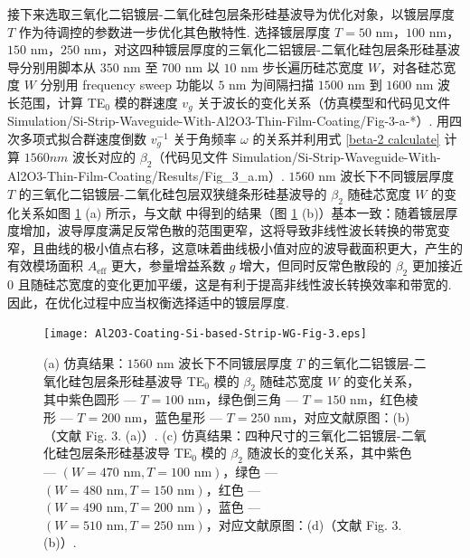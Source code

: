 \documentclass[zh]{assignment}
\begin{document}
接下来选取三氧化二铝镀层-二氧化硅包层条形硅基波导为优化对象，以镀层厚度 $T$ 作为待调控的参数进一步优化其色散特性. 选择镀层厚度 $T=50$ nm，$100$ nm，$150$ nm，$250$ nm，对这四种镀层厚度的三氧化二铝镀层-二氧化硅包层条形硅基波导分别用脚本从 $350$ nm 至 $700$ nm 以 $10$ nm 步长遍历硅芯宽度 $W$，对各硅芯宽度 $W$ 分别用 frequency sweep 功能以 $5$ nm 为间隔扫描 $1500$ nm 到 $1600$ nm 波长范围，计算 TE$_0$ 模的群速度 $v_g$ 关于波长的变化关系（仿真模型和代码见文件 Simulation/Si-Strip-Waveguide-With-Al2O3-Thin-Film-Coating/Fig-3-a-*）. 用四次多项式拟合群速度倒数 $v_g^{-1}$ 关于角频率 $\omega$ 的关系并利用式 \eqref{beta-2 calculate} 计算 $1560nm$ 波长对应的 $\beta_2$（代码见文件 Simulation/Si-Strip-Waveguide-With-Al2O3-Thin-Film-Coating/Results/Fig\_3\_a.m）. $1560$ nm 波长下不同镀层厚度 $T$ 的三氧化二铝镀层-二氧化硅包层双狭缝条形硅基波导的 $\beta_2$ 随硅芯宽度 $W$ 的变化关系如图 \ref{Al2O3-Coating-Si-based-Strip-WG-Fig-3} (a) 所示，与文献 \cite{guo2018experimentally} 中得到的结果（图 \ref{Al2O3-Coating-Si-based-Strip-WG-Fig-3} (b)）基本一致：随着镀层厚度增加，波导厚度满足反常色散的范围更窄，这将导致非线性波长转换的带宽变窄，且曲线的极小值点右移，这意味着曲线极小值对应的波导截面积更大，产生的有效模场面积 $A_{\text{eff}}$ 更大，参量增益系数 $g$ 增大，但同时反常色散段的 $\beta_2$ 更加接近 $0$ 且随硅芯宽度的变化更加平缓，这是有利于提高非线性波长转换效率和带宽的. 因此，在优化过程中应当权衡选择适中的镀层厚度.

\begin{figure}[ht]
    \centering
    \texttt{[image: Al2O3-Coating-Si-based-Strip-WG-Fig-3.eps]}
    \caption{(a) 仿真结果：$1560$ nm 波长下不同镀层厚度 $T$ 的三氧化二铝镀层-二氧化硅包层条形硅基波导 TE$_0$ 模的 $\beta_2$ 随硅芯宽度 $W$ 的变化关系，其中紫色圆形 --- $T=100$ nm，绿色倒三角 --- $T=150$ nm，红色棱形 --- $T=200$ nm，蓝色星形 --- $T=250$ nm，对应文献原图：(b)（文献 \cite{guo2018experimentally} Fig. 3. (a)）. (c) 仿真结果：四种尺寸的三氧化二铝镀层-二氧化硅包层条形硅基波导 TE$_0$ 模的 $\beta_2$ 随波长的变化关系，其中紫色 --- $(W=470\text{ nm},T=100\text{ nm})$，绿色 --- $(W=480\text{ nm},T=150\text{ nm})$，红色 --- $(W=490\text{ nm},T=200\text{ nm})$，蓝色 --- $(W=510\text{ nm},T=250\text{ nm})$，对应文献原图：(d)（文献 \cite{guo2018experimentally} Fig. 3. (b)）.}
    \label{Al2O3-Coating-Si-based-Strip-WG-Fig-3}
\end{figure}
\end{document}
